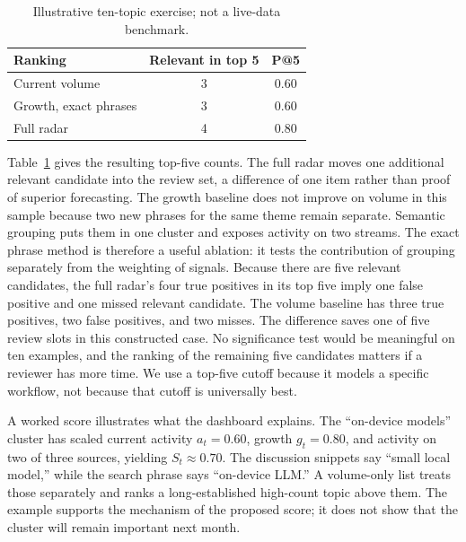 \documentclass[../../proceedings/main.tex]{subfiles}
\begin{document}
\begin{refsection}
\begin{table}[t]
  \centering
  \caption{Illustrative ten-topic exercise; not a live-data benchmark.}
  \label{tab:radar-results}
  \begin{tabular}{lcc}\toprule
    Ranking & Relevant in top 5 & P@5 \\ \midrule
    Current volume & 3 & 0.60 \\
    Growth, exact phrases & 3 & 0.60 \\
    Full radar & 4 & 0.80 \\ \bottomrule
  \end{tabular}
\end{table}
Table~\ref{tab:radar-results} gives the resulting top-five counts. The full
radar moves one additional relevant candidate into the review set, a
difference of one item rather than proof of superior forecasting. The growth
baseline does not improve on volume in this sample because two new phrases
for the same theme remain separate. Semantic grouping puts them in one
cluster and exposes activity on two streams. The exact phrase method is
therefore a useful ablation: it tests the contribution of grouping separately
from the weighting of signals.
Because there are five relevant candidates, the full radar's four true
positives in its top five imply one false positive and one missed relevant
candidate. The volume baseline has three true positives, two false positives,
and two misses. The difference saves one of five review slots in this
constructed case. No significance test would be meaningful on ten examples,
and the ranking of the remaining five candidates matters if a reviewer has
more time. We use a top-five cutoff because it models a specific workflow,
not because that cutoff is universally best.

A worked score illustrates what the dashboard explains. The ``on-device
models'' cluster has scaled current activity $a_t=0.60$, growth $g_t=0.80$,
and activity on two of three sources, yielding $S_t\approx0.70$. The
discussion snippets say ``small local model,'' while the search phrase says
``on-device LLM.'' A volume-only list treats those separately and ranks a
long-established high-count topic above them. The example supports the
mechanism of the proposed score; it does not show that the cluster will
remain important next month.


\end{refsection}
\end{document}
